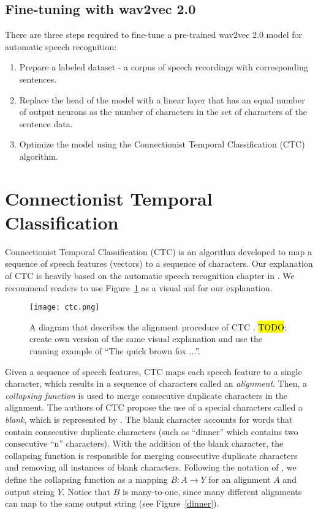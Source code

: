 \subsection{Fine-tuning with wav2vec 2.0}\label{subsec:finetune}
There are three steps required to fine-tune a pre-trained wav2vec 2.0 model for automatic speech recognition:
\begin{enumerate}
    \item Prepare a labeled dataset - a corpus of speech recordings with corresponding sentences.
    \item Replace the head of the model with a linear layer that has an equal number of output neurons as the number of
    characters in the set of characters of the sentence data.
    \item Optimize the model using the Connectionist Temporal Classification (CTC) algorithm.
\end{enumerate}



\section{Connectionist Temporal Classification}\label{sec:ctc}
Connectionist Temporal Classification (CTC) \cite{graves2006connectionist} is an algorithm 
developed to map a sequence of speech features  (vectors) to a sequence of characters.
Our explanation of CTC is heavily based on the automatic speech recognition chapter in \cite{jurafskyspeech}.
We recommend readers to use Figure~\ref{ctc} as a visual aid for our explanation.

\begin{figure}[h!]
    \centering
    \captionsetup{justification=centering}
    \texttt{[image: ctc.png]}
    \caption{A diagram that describes the alignment procedure of CTC \cite{jurafskyspeech}. \hl{TODO}: create own version of the same visual explanation and use the running example of ``The quick brown fox ...''.}
    \label{ctc}
\end{figure}

Given a sequence of speech features, CTC maps each speech feature to a single character, which results in a sequence of characters called an \emph{alignment}. 
Then, a \emph{collapsing function} is used to merge consecutive duplicate characters in the alignment.
The authors of CTC propose the use of a special characters called a \emph{blank}, which is represented by \textvisiblespace.
The blank character accounts for words that contain consecutive duplicate characters (such as ``dinner'' which contains two consecutive ``n'' characters).
With the addition of the blank character, the collapsing function is responsible for merging consecutive duplicate characters and removing all instances of blank characters.
Following the notation of \cite{jurafskyspeech}, we define the collapsing function as a mapping $B: A \rightarrow Y$ for an alignment $A$ and output string $Y$.
Notice that $B$ is many-to-one, since many different alignments can map to the same output string (see Figure~\ref{dinner}).

